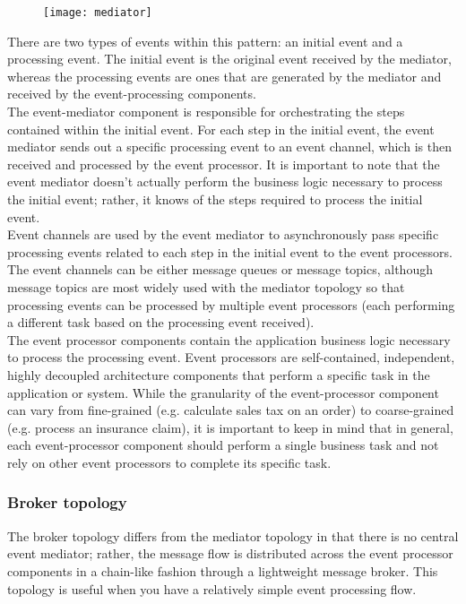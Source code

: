 \documentclass[11pt]{article} %
\begin{document}
\begin{figure} [H]
	\centering
	\texttt{[image: mediator]}
\end{figure}
There are two types of events within this pattern: an initial event and a processing event. The initial event is the original event received by the mediator, whereas the processing events are ones that are generated by the mediator and received by the event-processing components.\\
The event-mediator component is responsible for orchestrating the steps contained within the initial event. For each step in the initial event, the event mediator sends out a specific processing event to an event channel, which is then received and processed by the event processor. It is important to note that the event mediator doesn’t actually perform the business logic necessary to process the initial event; rather, it knows of the steps required to process the initial event.\\
Event channels are used by the event mediator to asynchronously pass specific processing events related to each step in the initial event to the event processors. The event channels can be either message queues or message topics, although message topics are most widely used with the mediator topology so that processing events can be processed by multiple event processors (each performing a different task based on the processing event received).\\
The event processor components contain the application business logic necessary to process the processing event. Event processors are self-contained, independent, highly decoupled architecture components that perform a specific task in the application or system. While the granularity of the event-processor component can vary from fine-grained (e.g. calculate sales tax on an order) to coarse-grained (e.g. process an insurance claim), it is important to keep in mind that in general, each event-processor component should perform a single business task and not rely on other event processors to complete its specific task.

\subsubsection{Broker topology}
The broker topology differs from the mediator topology in that there is no central event mediator; rather, the message flow is distributed across the event processor components in a chain-like fashion through a lightweight message broker. This topology is useful when you have a relatively simple event processing flow.
\end{document}
